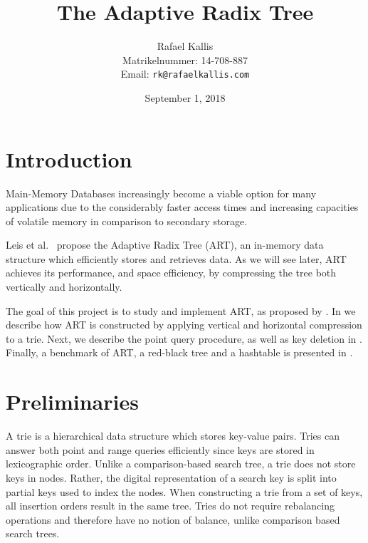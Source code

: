 \documentclass[abstracton,12pt]{scrartcl}
\title{The Adaptive Radix Tree}
\author{
    Rafael Kallis\\[-5pt]
    \scriptsize Matrikelnummer: 14-708-887\\[-5pt]
    \scriptsize Email: \texttt{rk@rafaelkallis.com}
}
\date{\vspace*{2cm}September 1, 2018}
\theoremstyle{definition}
\begin{document}
\maketitle





\newpage
\section{Introduction}

Main-Memory Databases increasingly become a viable option for many applications
due to the considerably faster access times and increasing capacities of 
volatile memory in comparison to secondary storage.

Leis et al.\ \cite{leis2013adaptive} propose the Adaptive Radix Tree (ART), an in-memory
data structure which efficiently stores and retrieves data.
As we will see later, ART achieves its performance, and space
efficiency, by compressing the tree both vertically and horizontally.

The goal of this project is to study and implement ART, as proposed by 
\cite{leis2013adaptive}. 
In  we describe how ART is constructed by applying 
vertical and horizontal compression to a trie.
Next, we describe the point query procedure, as well as 
key deletion in .
Finally, a benchmark of ART, a red-black tree and a hashtable
is presented in .

\section{Preliminaries}\label{sec:preliminaries}

A trie \cite{fredkin1960trie} is a hierarchical data structure which
stores key-value pairs. Tries can answer both point and range queries 
efficiently since keys are stored in lexicographic order.
Unlike a comparison-based search tree, a trie does not store keys in nodes.
Rather, the digital representation of a search key is split into partial
keys used to index the nodes. When 
constructing a trie from a set of keys, all insertion orders result in the 
same tree. Tries do not require rebalancing operations and therefore have 
no notion of balance, unlike comparison based search trees.
\end{document}
